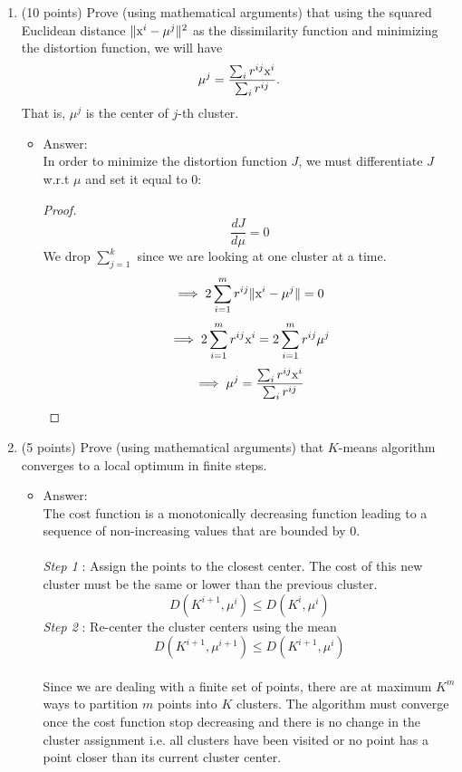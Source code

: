 \documentclass[twoside,10pt]{article}
\begin{document}
\begin{enumerate}

\item (10 points) Prove (using mathematical arguments) that using the squared Euclidean distance $\|\text x^i-\mu^j\|^2$ as the dissimilarity function and minimizing the distortion function, we will have 
   $$\mu^j=\frac{\sum_i r^{ij} \text x^i}{\sum_i r^{ij}}.$$
   That is, $\mu^j$ is the center of $j$-th cluster. 
   \begin{itemize}
   \item Answer:\\
   In order to minimize the distortion function $J$, we must differentiate $J$ w.r.t $\mu$ and set it equal to 0:
   \begin{proof}
   $$\frac{dJ}{d\mu} = 0$$
   We drop $\sum_{j=1}^k$ since we are looking at one cluster at a time.
   $$\implies 2\sum_{i=1}^m r^{ij} \|\text x^i-\mu^j\| = 0$$
   $$\implies 2\sum_{i=1}^m r^{ij} \text x^i = 2\sum_{i=1}^m r^{ij}\mu^j$$
   $$\implies \mu^j=\frac{\sum_i r^{ij} \text x^i}{\sum_i r^{ij}} $$
   \end{proof}
   

   \end{itemize}

\item (5 points) Prove (using mathematical arguments) that $K$-means algorithm converges to a local optimum in finite steps. 
	\begin{itemize}
   \item Answer:\\
   The cost function is a monotonically decreasing function leading to a sequence of non-increasing values that are bounded by 0.\\
   \\
   \textit{Step 1} : Assign the points to the closest center. The cost of this new cluster must be the same or lower than the previous cluster.
   $$ D (K^{i+1},\mu^{i}) \leq D(K^{i},\mu^{i})$$
   \textit{Step 2} : Re-center the cluster centers using the mean
   $$ D (K^{i+1},\mu^{i+1}) \leq D(K^{i+1},\mu^{i})$$\\
   Since we are dealing with a finite set of points, there are at maximum $K^{m}$ ways to partition $m$ points into $K$ clusters. The algorithm must converge once the cost function stop decreasing and there is no change in the cluster assignment i.e. all clusters have been visited or no point has a point closer than its current cluster center. 
   

   \end{itemize}


\end{enumerate}
\end{document}
